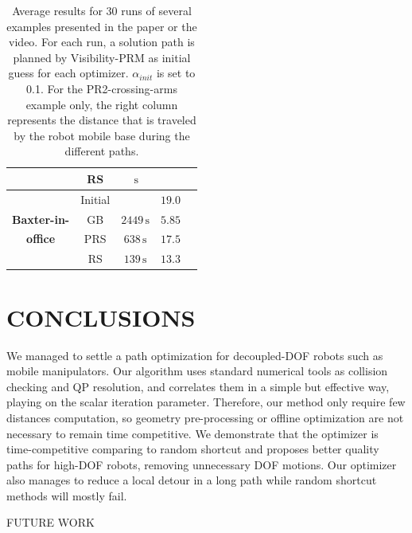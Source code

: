 \documentclass{tADR2e}
\begin{document}
\begin{table}
{\begin{tabular}{ccccc}
    & RS &  $\,\text{s}$ & $ $ &\\
    \midrule
    & Initial &  & $19.0$ &\\
    \textbf{Baxter-in-} & GB & $2449\,\text{s}$ & $5.85$ &\\
    \textbf{office} & PRS & $638\,\text{s}$ & $17.5$ &\\
    & RS & $139\,\text{s}$ & $13.3$ &\\
    \bottomrule
  \end{tabular}
  }%
\caption{Average results for 30 runs of several examples presented in the paper or 
the video. For each run, a solution path is planned by Visibility-PRM as initial 
guess for each optimizer. $\alpha_{init}$ is set to 0.1.
For the PR2-crossing-arms example only, the right column represents the 
distance that is traveled by the robot mobile base during the different paths.
}
\label{tab:results}
\end{table}



\section{CONCLUSIONS}
We managed to settle a path optimization for decoupled-DOF robots such as mobile 
manipulators. Our algorithm uses standard numerical tools as collision checking 
and QP resolution, and correlates them in a 
simple but effective way, playing on the scalar iteration parameter. Therefore, 
our method only require few distances computation, so geometry pre-processing or 
offline optimization are not necessary to remain time competitive. We demonstrate 
that the optimizer is 
time-competitive comparing to random shortcut and proposes better quality paths 
for high-DOF robots, removing unnecessary DOF motions. Our optimizer also manages 
to reduce a local detour in a long path while random shortcut methods will mostly 
fail.

FUTURE WORK



\end{document}
